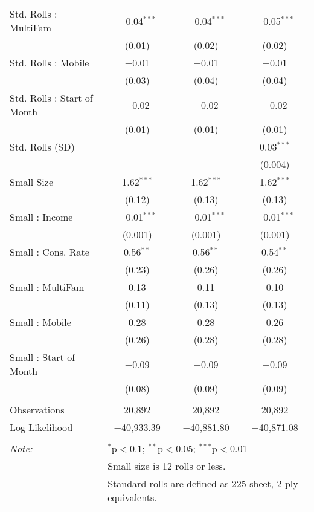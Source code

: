 \begin{table}[!htbp]
\begin{tabular}{@{\extracolsep{5pt}}lccc}
  Std. Rolls : MultiFam & $-$0.04$^{***}$ & $-$0.04$^{***}$ & $-$0.05$^{***}$ \\ 
  & (0.01) & (0.02) & (0.02) \\ 
  Std. Rolls : Mobile & $-$0.01 & $-$0.01 & $-$0.01 \\ 
  & (0.03) & (0.04) & (0.04) \\ 
  Std. Rolls : Start of Month & $-$0.02 & $-$0.02 & $-$0.02 \\ 
  & (0.01) & (0.01) & (0.01) \\ 
  Std. Rolls (SD) &  &  & 0.03$^{***}$ \\ 
  &  &  & (0.004) \\ 
  Small Size & 1.62$^{***}$ & 1.62$^{***}$ & 1.62$^{***}$ \\ 
  & (0.12) & (0.13) & (0.13) \\ 
  Small : Income & $-$0.01$^{***}$ & $-$0.01$^{***}$ & $-$0.01$^{***}$ \\ 
  & (0.001) & (0.001) & (0.001) \\ 
  Small : Cons. Rate & 0.56$^{**}$ & 0.56$^{**}$ & 0.54$^{**}$ \\ 
  & (0.23) & (0.26) & (0.26) \\ 
  Small : MultiFam & 0.13 & 0.11 & 0.10 \\ 
  & (0.11) & (0.13) & (0.13) \\ 
  Small : Mobile & 0.28 & 0.28 & 0.26 \\ 
  & (0.26) & (0.28) & (0.28) \\ 
  Small : Start of Month & $-$0.09 & $-$0.09 & $-$0.09 \\ 
  & (0.08) & (0.09) & (0.09) \\ 
 \hline \\[-1.8ex] 
Observations & 20,892 & 20,892 & 20,892 \\ 
Log Likelihood & $-$40,933.39 & $-$40,881.80 & $-$40,871.08 \\ 
\hline 
\hline \\[-1.8ex] 
\textit{Note:}  & \multicolumn{3}{l}{$^{*}$p$<$0.1; $^{**}$p$<$0.05; $^{***}$p$<$0.01} \\ 
 & \multicolumn{3}{l}{Small size is 12 rolls or less.} \\ 
 & \multicolumn{3}{l}{Standard rolls are defined as 225-sheet, 2-ply equivalents.} \\ 
\end{tabular} 
\end{table} 
